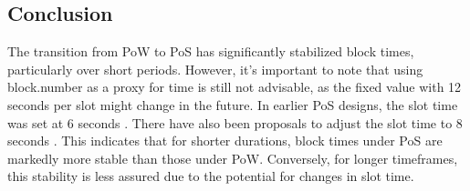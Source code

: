 \subsection{Conclusion}
The transition from PoW to PoS has significantly stabilized block times,
particularly over short periods. However, it's important to note that using
block.number as a proxy for time is still not advisable, as the fixed value
with 
12 seconds per slot might change in the future. In earlier PoS designs, the
slot time was set at 6 seconds \cite{block_time_6_to_12_sec}. There have
also been proposals to adjust the slot time to 8 seconds
\cite{proposed_block_time_8_seconds}. This indicates that for shorter
durations, block times under PoS are markedly more stable than those under
PoW. Conversely, for longer timeframes, this stability is less assured due
to the potential for changes in slot time.


